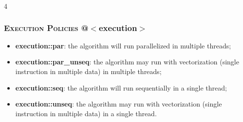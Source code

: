 \documentclass[10pt]{article}
\begin{document}
\begin{multicols*}{4}
{\begin{itemize}[leftmargin=*,topsep=0.25pt]
\end{itemize}

\subsubsection*{\textsc{Execution Policies} @$<$execution$>$} 
\begin{itemize}[leftmargin=*,topsep=0.25pt]
  \setlength\itemsep{-1.8pt}
  \item  {\textbf{execution::par}}: the algorithm will run parallelized in multiple threads;
\item  {\textbf{execution::par\_unseq}}: the algorithm may run with vectorization (single instruction in multiple data) in multiple threads; 
  \item  {\textbf{execution::seq}}: the algorithm will run sequentially in a single thread;
\item  {\textbf{execution::unseq}}: the algorithm may run with vectorization (single instruction in multiple data) in a single thread.

\end{itemize}


}
\end{multicols*}
\end{document}
